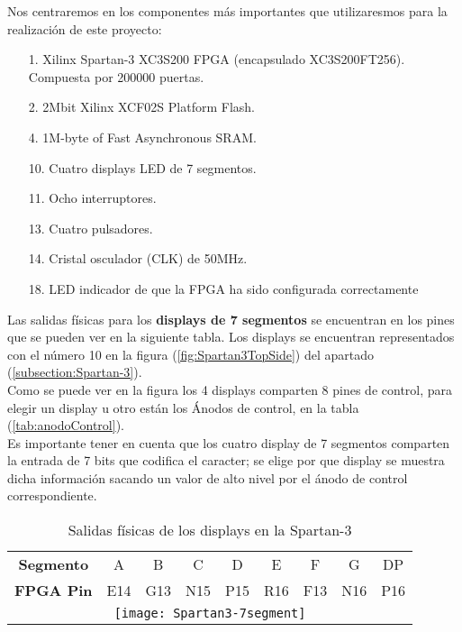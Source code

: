     Nos centraremos en los componentes más importantes que utilizaresmos para la realización de este proyecto:

    \begin{itemize}
        \item [1.] Xilinx Spartan-3 XC3S200 FPGA  (encapsulado XC3S200FT256). Compuesta por 200000 puertas.
        \item [2.] 2Mbit Xilinx XCF02S Platform Flash.
        \item [4.] 1M-byte of Fast Asynchronous SRAM.
        \item [10.] Cuatro displays LED de 7 segmentos.
        \item [11.] Ocho interruptores.
        \item [13.] Cuatro pulsadores.
        \item [14.] Cristal osculador (CLK) de 50MHz.
        \item [18.] LED indicador de que la FPGA ha sido configurada correctamente

    \end{itemize}

    Las salidas físicas para los \textbf{displays de 7 segmentos} se encuentran en los pines que se pueden ver en la siguiente tabla. Los displays se encuentran representados con el número 10 en la figura (\ref{fig:Spartan3TopSide}) del apartado (\ref{subsection:Spartan-3}). \\ 

    Como se puede ver en la figura los 4 displays comparten 8 pines de control, para elegir un display u otro están los Ánodos de control, en la tabla (\ref{tab:anodoControl}). \\ 

    Es importante tener en cuenta que los cuatro display de 7 segmentos comparten la entrada de 7 bits que codifica el caracter; se elige por que display se muestra dicha información sacando un valor de alto nivel por el ánodo de control correspondiente. \\ 

    \begin{table}[H]
            \centering
            \begin{tabular}{|c|c|c|c|c|c|c|c|c|}
                \hline
                \rowcolor[rgb]{0.21,0.69,0.87}\multicolumn{9}{|c|}{  \textbf{ {Salidas físicas Display 7 segmentos}}} \\
                \hline \hline
                \textbf{  Segmento  } & A & B & C & D & E & F & G & DP \\ 
                \hline
                \textbf{  FPGA Pin  }  & E14 & G13 & N15 & P15 & R16 & F13 & N16 & P16 \\ 
                \hline
                \multicolumn{9}{|c|}{\texttt{[image: Spartan3-7segment]}}\\
                \hline
                 
            \end{tabular}
        \caption{ Salidas físicas de los displays en la Spartan-3 }
        \label{tab:tablaSalidas7Segmentos}
    \end{table}

